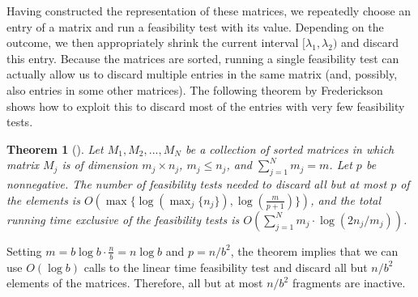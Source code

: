 \documentclass[11pt,a4paper]{article}
\newtheorem{theorem}{Theorem}[section]
\theoremstyle{definition}
\theoremstyle{remark}
\begin{document}
Having constructed the representation of these matrices, we repeatedly choose an entry of a matrix and run a feasibility test with its value.  %
Depending on the outcome, we then appropriately shrink the current interval $[\lambda_{1},\lambda_{2})$ and discard this entry.
Because the matrices are sorted, running a single feasibility test can actually allow us to discard multiple entries in the same matrix
(and, possibly, also entries in some other matrices). The following theorem by Frederickson shows how to exploit this to discard most
of the entries with very few feasibility tests.

\begin{theorem}[\cite{Frederickson1991}]\label{Frederickson's theorem}
Let  ${M_1, M_2, . . . , M_N}$ be a collection of sorted matrices in which matrix $M_j$ is of dimension $m_j \times n_j$, $m_j \leq n_j$, and $\sum_{j=1}^{N} m_j = m$.
Let $p$ be nonnegative. The number of feasibility tests needed to discard all but at most $p$ of the elements is $O(\max \lbrace \log(\max_{j} \lbrace n_j \rbrace), \log(\frac{m}{p+1}) \rbrace)$, and the total running time exclusive of the feasibility tests is $O(\sum_{j=1}^{N} m_j \cdot \log (2n_j/m_j))$.
\end{theorem}

Setting $m=b \log b \cdot \frac{n}{b} = n \log b$ and $p=n/b^2$, the theorem implies that we can use $O(\log b)$ calls to the linear time feasibility test and discard all but $n/b^2$ elements of the matrices. Therefore, all but at most $n/b^{2}$ fragments are inactive.
\end{document}
